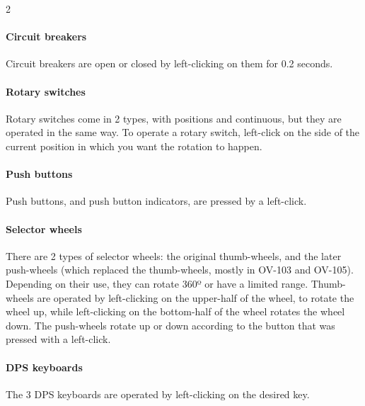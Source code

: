 \documentclass[Space_Shuttle_Vessel_Manual.tex]{subfiles}
\begin{document}
\begin{multicols*}{2}
\paragraph{Circuit breakers}
Circuit breakers are open or closed by left-clicking on them for 0.2 seconds.

\paragraph{Rotary switches}
Rotary switches come in 2 types, with positions and continuous, but they are operated in the same way. To operate a rotary switch, left-click on the side of the current position in which you want the rotation to happen.

\paragraph{Push buttons}
Push buttons, and push button indicators, are pressed by a left-click.

\paragraph{Selector wheels}
There are 2 types of selector wheels: the original thumb-wheels, and the later push-wheels (which replaced the thumb-wheels, mostly in OV-103 and OV-105). Depending on their use, they can rotate 360º or have a limited range. Thumb-wheels are operated by left-clicking on the upper-half of the wheel, to rotate the wheel up, while left-clicking on the bottom-half of the wheel rotates the wheel down. The push-wheels rotate up or down according to the button that was pressed with a left-click.


\paragraph{DPS keyboards}
The 3 DPS keyboards are operated by left-clicking on the desired key.



\end{multicols*}
\end{document}
